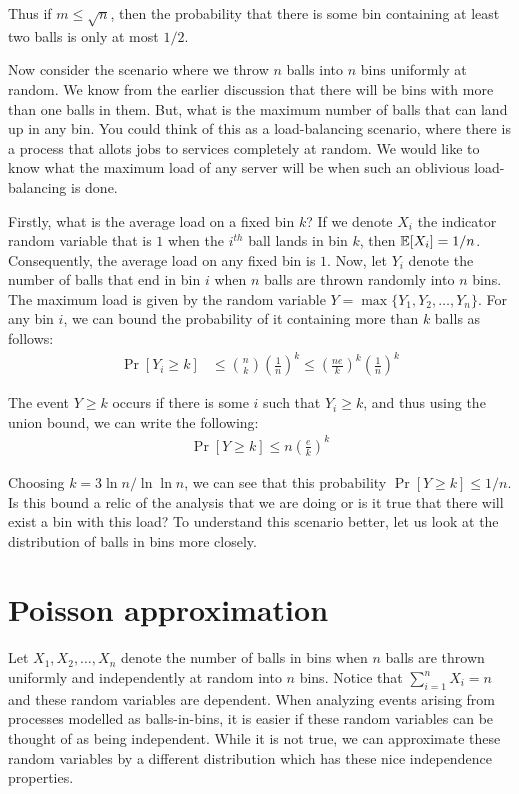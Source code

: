 Thus if $m \leq \sqrt{n}$, then the probability that there is some bin
containing at least two balls is only at most $1/2$.

Now consider the scenario where we throw $n$ balls into $n$ bins uniformly at
random. We know from the earlier discussion that there will be bins with more
than one balls in them. But, what is the maximum number of balls that can land
up in any bin. You could think of this as a load-balancing scenario, where there
is a process that allots jobs to services completely at random. We would like to
know what the maximum load of any server will be when such an oblivious
load-balancing is done.

Firstly, what is the average load on a fixed bin $k$? If we denote $X_i$ the
indicator random variable that is $1$ when the $i^{th}$ ball lands in bin $k$,
then $\mathbb{E}[X_i] = 1/n$. Consequently, the average load on any fixed bin is
$1$. Now, let $Y_i$ denote the number of balls that end in bin $i$ when $n$
balls are thrown randomly into $n$ bins. The maximum load is given by the random
variable $Y = \max\{Y_1, Y_2, \ldots, Y_n\}$. For any bin $i$, we can bound the
probability of it containing more than $k$ balls as follows:
\begin{align*}
  \Pr[Y_i \geq k] &\leq \binom{n}{k} \left( \frac{1}{n} \right)^k \leq \left( \frac{ne}{k} \right)^k  \left( \frac{1}{n} \right)^k
\end{align*}

The event $Y \geq k$ occurs if there is some $i$ such that $Y_i \geq k$, and
thus using the union bound, we can write the following:
\begin{align*}
  \Pr[Y \geq k] \leq n\left(\frac{e}{k} \right)^k
\end{align*}

Choosing $k = 3\ln n/\ln \ln n$, we can see that this probability
$\Pr[Y \geq k] \leq 1/n$. Is this bound a relic of the analysis that we are
doing or is it true that there will exist a bin with this load? To understand
this scenario better, let us look at the distribution of balls in bins more
closely.

\section{Poisson approximation}

Let $X_1, X_2, \ldots, X_n$ denote the number of balls in bins when $n$ balls
are thrown uniformly and independently at random into $n$ bins. Notice that
$\sum_{i=1}^n X_i = n$ and these random variables are dependent. When analyzing
events arising from processes modelled as balls-in-bins, it is easier if these
random variables can be thought of as being independent. While it is not true,
we can approximate these random variables by a different distribution which has
these nice independence properties.

